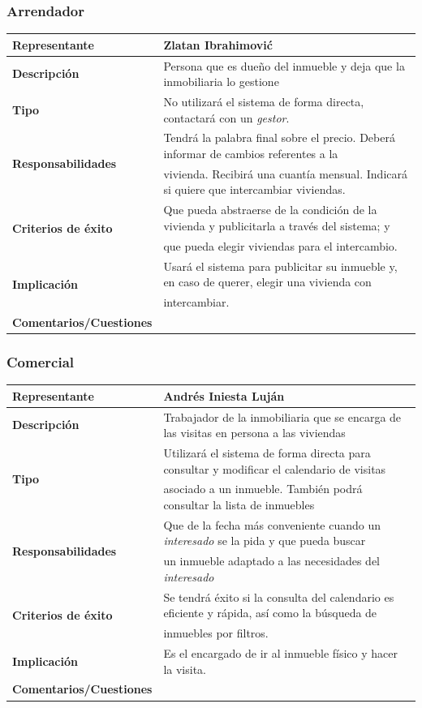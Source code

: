 \documentclass[10pt,a4paper]{article}
\begin{document}
{\subsubsection*{Arrendador}
\begin{tabular}{|l|l|}
\hline
{\small\textbf{Representante}} & Zlatan Ibrahimović \\ \hline
{\small\textbf{Descripción}} & Persona que es dueño del inmueble y deja que la inmobiliaria lo gestione \\ \hline
{\small\textbf{Tipo}} & No utilizará el sistema de forma directa, contactará con un \textit{gestor}. \\ \hline
\multirow{2}{*}{\small\textbf{Responsabilidades}} & Tendrá la palabra final sobre el precio. Deberá informar de cambios referentes a la\\
& vivienda. Recibirá una cuantía mensual. Indicará si quiere que intercambiar viviendas. \\ \hline
\multirow{2}{*}{\small\textbf{Criterios de éxito}} & Que pueda abstraerse de la condición de la vivienda y publicitarla a través del sistema; y\\
&que pueda elegir viviendas para el intercambio. \\ \hline
\multirow{2}{*}{\small\textbf{Implicación}} & Usará el sistema para publicitar su inmueble y, en caso de querer, elegir una vivienda con\\
 & intercambiar. \\ \hline
{\small\textbf{Comentarios/Cuestiones}} & \\ \hline
\end{tabular}
\subsubsection*{Comercial}
\begin{tabular}{|l|l|}
\hline
{\small\textbf{Representante}} & Andrés Iniesta Luján \\ \hline
{\small\textbf{Descripción}} & Trabajador de la inmobiliaria que se encarga de las visitas en persona a las viviendas \\ \hline
\multirow{2}{*}{\small\textbf{Tipo}} & Utilizará el sistema de forma directa para consultar y modificar el calendario de visitas\\
 & asociado a un inmueble. También podrá consultar la lista de inmuebles \\ \hline
\multirow{2}{*}{\small\textbf{Responsabilidades}} & Que de la fecha más conveniente cuando un \textit{interesado} se la pida y que pueda buscar\\
 & un inmueble adaptado a las necesidades del \textit{interesado} \\ \hline
\multirow{2}{*}{\small\textbf{Criterios de éxito}} & Se tendrá éxito si la consulta del calendario es eficiente y rápida, así como la búsqueda de\\
 & inmuebles por filtros. \\ \hline
{\small\textbf{Implicación}} & Es el encargado de ir al inmueble físico y hacer la visita. \\ \hline
{\small\textbf{Comentarios/Cuestiones}} & \\ \hline
\end{tabular}
}
\end{document}
